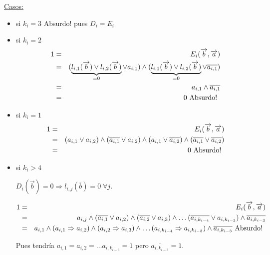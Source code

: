 \documentclass[12pt,a4paper]{report}
\begin{document}
			\vspace{3mm}
			\underline{Casos:}
				\begin{itemize}
					\item si $k_{i} = 3$ Absurdo! pues $D_{i} = E_{i}$
					\item si $k_{i} = 2$
						\begin{eqnarray}
							\nonumber 1 &=& E_{i}(\overrightarrow{b}, \overrightarrow{a}) \\
							\nonumber &=& (\underbrace{l_{i, 1}(\overrightarrow{b}) \vee l_{i, 2}(\overrightarrow{b})}_{= 0} \vee a_{i, 1}) \wedge (\underbrace{l_{i, 1}(\overrightarrow{b}) \vee l_{i, 2}(\overrightarrow{b})}_{= 0} \vee \overline{a_{i, 1}}) \\
							\nonumber &=& a_{i, 1} \wedge \overline{a_{i, 1}} \\
							\nonumber &=& 0 \textup{ Absurdo! }
						\end{eqnarray}
					\item si $k_{i} = 1$
						\begin{eqnarray}
							\nonumber 1 &=& E_{i}(\overrightarrow{b}, \overrightarrow{a}) \\
							\nonumber &=& (a_{i, 1} \vee a_{i, 2}) \wedge (\overline{a_{i, 1}} \vee a_{i, 2}) \wedge (a_{i, 1} \vee \overline{a_{i, 2}}) \wedge (\overline{a_{i, 1}} \vee \overline{a_{i, 2}}) \\
							\nonumber &=& 0 \textup{ Absurdo! }
						\end{eqnarray}
					\item si $k_{i} > 4$

						$D_{i}(\overrightarrow{b}) = 0 \Rightarrow l_{i, j}(\overline{b}) = 0 \; \forall j$.

						\begin{eqnarray}
							\nonumber 1 &=& E_{i}(\overrightarrow{b}, \overrightarrow{a}) \\
							\nonumber &=& a_{i, j} \wedge (\overline{a_{i, 1}} \vee a_{i, 2}) \wedge (\overline{a_{i, 2}} \vee a_{i, 3}) \wedge \dotsc  	(\overline{a_{i, k_{i-4}}} \vee a_{i, k_{i-3}}) \wedge \overline{a_{i, k_{i-3}}} \\
							\nonumber &=& a_{i, 1} \wedge (a_{i, 1} \Rightarrow a_{i, 2}) \wedge (a_{i, 2}\Rightarrow a_{i, 3}) \wedge 	\dotsc (a_{i, k_{i-4}} \Rightarrow a_{i, k_{i-3}}) \wedge \overline{a_{i, k_{i-3}}} \textup{ Absurdo! }
						\end{eqnarray}

						\par Pues tendría $a_{i, 1} = a_{i, 2} = \dotsc a_{i, k_{i-3}} = 1$ pero $\overline{a_{i, k_{i-3}}} = 1$.
				\end{itemize}
\end{document}
